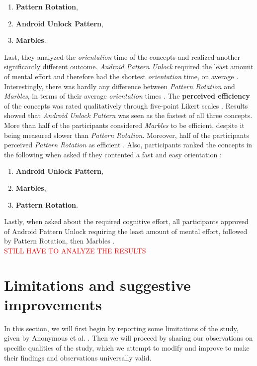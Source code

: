 \begin{enumerate}
    \item \textbf{Pattern Rotation},
    \item \textbf{Android Unlock Pattern},
    \item \textbf{Marbles}.
\end{enumerate}

Last, they analyzed the \textit{orientation} time of the concepts and realized another significantly different outcome. \textit{Android Pattern Unlock} required the least amount of mental effort and therefore had the shortest \textit{orientation} time, on average \cite{anonymous}. Interestingly, there was hardly any difference between \textit{Pattern Rotation} and \textit{Marbles}, in terms of their average \textit{orientation} times \cite{anonymous}. The \textbf{perceived efficiency} of the concepts was rated qualitatively through five-point Likert scales \cite{anonymous}. Results showed that \textit{Android Unlock Pattern} was seen as the fastest of all three concepts. More than half of the participants considered \textit{Marbles} to be efficient, despite it being measured slower than \textit{Pattern Rotation}. Moreover, half of the participants perceived \textit{Pattern Rotation} as efficient \cite{anonymous}. Also, participants ranked the concepts in the following when asked if they contented a fast and easy orientation \cite{anonymous}: 

\begin{enumerate}
     \item \textbf{Android Unlock Pattern},
    \item \textbf{Marbles},
    \item \textbf{Pattern Rotation}.
\end{enumerate}

Lastly, when asked about the required cognitive effort, all participants approved of Android Pattern Unlock requiring the least amount of mental effort, followed by Pattern Rotation, then Marbles \cite{anonymous}. \\

\textcolor{red}{STILL HAVE TO ANALYZE THE RESULTS}

\section{Limitations and suggestive improvements}

In this section, we will first begin by reporting some limitations of the study, given by Anonymous et al. \cite{anonymous}. Then we will proceed by sharing our observations on specific qualities of the study, which we attempt to modify and improve to make their findings and observations universally valid.  

